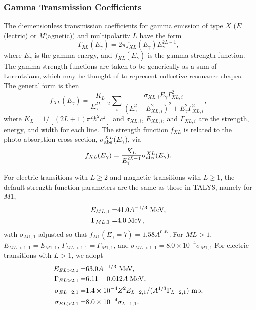 \documentclass[
10pt,
showpacs,preprintnumbers,footinbib,
amsfonts,amsmath,amssymb,
aps,
prc,twocolumn,groupedaddress,superscriptaddress,
showkeys,
nofootinbib
]{revtex4-1}
\begin{document}
\subsubsection{Gamma Transmission Coefficients}

The diemensionless transmission coefficients for gamma emission of type $X$ ($E$(lectric) or $M$(agnetic)) and multipolarity $L$ have the form
\begin{equation}
T_{XL}(E_\gamma) = 2\pi f_{XL}(E_\gamma)E_\gamma^{2L+1},
\end{equation}
where $E_\gamma$ is the gamma energy, and $f_{XL}(E_\gamma)$ is the gamma strength function. The gamma strength functions are taken to be generically as a sum of Lorentzians, which may be thought of to represent collective resonance shapes. The general form is then
\begin{equation}
f_{XL}(E_\gamma ) = \frac{K_L}{E_\gamma^{2L-2} }\sum_i \frac{\sigma_{XL,i} E_\gamma\Gamma^2_{XL,i}}{(E_\gamma^2 - E^2_{XL,i})^2+E^2_\gamma\Gamma^2_{XL,i}},
\label{eq:Lor}
\end{equation} 
where $K_L = 1/[(2L+1)\pi^2\hbar^2c^2]$ and $\sigma_{XL,i}$, $E_{XL,i}$, and $\Gamma_{XL,i}$ are the strength, energy, and width for each line.  The strength function $f_{XL}$ is related to the photo-absorption cross section, $\sigma_{\rm abs}^{XL}(E_\gamma)$, via
\begin{equation}
f_{XL}(E_\gamma) = \frac{K_L}{E_\gamma^{2L-1}}  \sigma_{\rm abs}^{XL}(E_\gamma).
\end{equation}

For electric transitions with $L \ge 2$ and magnetic transitions with $L \ge 1$, the default strength function parameters are the same as those in TALYS, namely for $M1$,
\begin{align}
E_{ML,1} =  & 41.0A^{-1/3}~{\rm MeV}, \notag \\
\Gamma_{ML,1} = & 4.0~{\rm MeV},
\end{align}
with $\sigma_{M1,1}$ adjusted so that $f_{M1}(E_\gamma = 7) = 1.58A^{0.47}$. For $ML>1$, $E_{ML>1,1} = E_{M1,1}$, $\Gamma_{ML>1,1} = \Gamma_{M1,1}$, and $\sigma_{ML>1,1} = 8.0\times 10^{-4}\sigma_{M1,1}$
 For electric transitions with $L > 1$, we adopt
\begin{align}
E_{EL>2,1} =  & 63.0A^{-1/3}~{\rm MeV},\notag\\
\Gamma_{EL>2,1} = & 6.11 - 0.012A~{\rm MeV},\notag\\
\sigma_{EL=2,1}= & 1.4\times 10^{-4}Z^2E_{L=2,1}/(A^{1/3}\Gamma_{L=2,1})~{\rm mb},\notag\\
\sigma_{EL>2,1}= & 8.0\times 10^{-4}\sigma_{L-1,1}.
\end{align}
\end{document}
